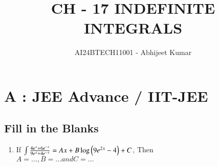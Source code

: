 \documentclass[article,12pt,onecolumn]{IEEEtran}
\theoremstyle{remark}
\begin{document}

\vspace{3cm}
\title{CH - 17 INDEFINITE INTEGRALS}
\author{AI24BTECH11001 - Abhijeet Kumar}
\maketitle
\bigskip
\section{A : JEE Advance / IIT-JEE}
\renewcommand{\thefigure}{\theenumi}
\renewcommand{\thetable}{\theenumi}
\subsection{Fill in the Blanks}
\begin{enumerate}
\item If $\int\frac{4e^{x}+ 6e^{-x}}{9e^{x} + 4e^{-x}} = Ax+B\log\left(9e^{2x}-4\right) + C$, Then
\\ $A=\dotso,B=\dotso and C=\dotso$
\hfill {}
\end{enumerate}
\end{document}
